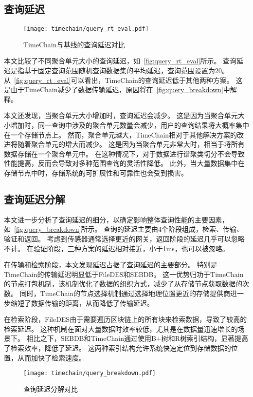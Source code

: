 \subsection{查询延迟}
\begin{figure}[t]
    \centering
    \texttt{[image: timechain/query\_rt\_eval.pdf]}
    \caption{TimeChain与基线的查询延迟对比}
    \label{fig:query_rt_eval}
\end{figure}
本文比较了不同聚合单元大小的查询延迟，如~\autoref{fig:query_rt_eval}所示。
查询延迟是指基于固定查询范围随机查询数据集的平均延迟，查询范围设置为20。
从~\autoref{fig:query_rt_eval}可以看出，TimeChain的查询延迟低于其他两种方案。
这是由于TimeChain减少了数据传输延迟，原因将在~\autoref{fig:query_breakdown}中解释。

本文还发现，当聚合单元大小增加时，查询延迟会减少。
这是因为当聚合单元大小增加时，同一查询中涉及的聚合单元数量会减少，用户的查询结果将大概率集中在一个存储节点上。
然而，聚合单元越大，TimeChain相对于其他解决方案的改进将随着聚合单元的增大而减少。
这是因为当聚合单元非常大时，相当于将所有数据存储在一个聚合单元中。
在这种情况下，对于数据进行谱聚类切分不会导致性能提高，反而会导致对多种范围查询的灵活性降低。
此外，当大量数据集中在存储节点中时，存储系统的可扩展性和可靠性也会受到损害。

\subsection{查询延迟分解}
本文进一步分析了查询延迟的细分，以确定影响整体查询性能的主要因素，如~\autoref{fig:query_breakdown}所示。
查询的延迟主要由4个阶段组成，检索、传输、验证和返回。
考虑到传感器通常选择更近的网关，返回阶段的延迟几乎可以忽略不计。
在验证阶段，三种方案的延迟相对接近，小于1ms，也可以被忽略。

在传输和检索阶段，本文发现延迟占据了查询延迟的主要部分。
特别是TimeChain的传输延迟明显低于FileDES和SEBDB。
这一优势归功于TimeChain的节点打包机制，该机制优化了数据的组织方式，减少了从存储节点获取数据的次数。
同时，TimeChain的节点选择机制通过选择地理位置更近的存储提供商进一步缩短了数据传输的距离，从而降低了传输延迟。

在检索阶段，FileDES由于需要遍历区块链上的所有块来检索数据，导致了较高的检索延迟。
这种机制在面对大量数据时效率较低，尤其是在数据量迅速增长的场景下。
相比之下，SEBDB和TimeChain通过使用B+树和R树索引结构，显著提高了检索效率，降低了延迟。
这两种索引结构允许系统快速定位到存储数据的位置，从而加快了检索速度。
\begin{figure}[t]
    \centering
    \texttt{[image: timechain/query\_breakdown.pdf]}
    \caption{查询延迟分解对比}
    \label{fig:query_breakdown}
\end{figure}

